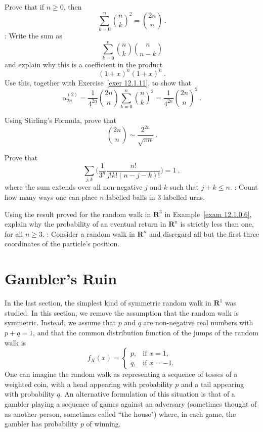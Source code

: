 \begin{LJSItem}
\item\label{exer 12.1.12}
Prove that if $n \ge 0$, then
$$\sum_{k = 0}^n {n \choose k}^2 = {{2n} \choose n}\ .$$
: Write the sum as 
$$\sum_{k = 0}^n {n \choose k}{n \choose {n-k}}$$
and explain why this is a coefficient in the product
$$(1 + x)^n (1 + x)^n\ .$$
Use this, together with Exercise~\ref{exer 12.1.11}, to show that
$$u^{(2)}_{2n} = \frac 1{4^{2n}}{{2n}\choose n}\sum_{k = 0}^n {n \choose k}^2 = 
\frac 1 {4^{2n}} {{2n}\choose n}^2\ .$$

\item\label{exer 12.1.13}
Using Stirling's Formula, prove that
$${{2n}\choose n} \sim \frac {2^{2n}}{\sqrt {\pi n}}\ .$$

\item\label{exer 12.1.14}
Prove that
$$\sum_{j,k} 
\biggl(\frac 1{3^n}\frac{n!}{j!k!(n-j-k)!}\biggr) = 1\ ,$$
where the sum extends over all non-negative $j$ and $k$ such that $j + k \le n$.  : 
Count how many ways one can place $n$ labelled balls in 3 labelled urns.

\item\label{exer 12.1.15}
Using the result proved for the random walk in ${\mathbf R}^3$ in Example~\ref{exam 12.1.0.6}, 
explain why the probability of an eventual return in ${\mathbf R}^n$ is strictly less than one,
for all $n \ge 3$.  : Consider a random walk in ${\mathbf R}^n$ and disregard all but
the first three coordinates of the particle's position.

\end{LJSItem}

\section{Gambler's Ruin\label{sec 12.2}}
\par
In the last section, the simplest kind of symmetric random walk in ${\mathbf R}^1$ was studied. 
In this section, we remove the assumption that the random walk is symmetric.  Instead, we assume
that
$p$ and $q$ are non-negative real numbers with $p+q = 1$, and that the common distribution function
of the jumps of the random walk is
$$f_X(x) = \left \{ \begin{array}{ll}
               p, & \mbox{if $x = 1$},\\ 
               q, & \mbox{if $x = -1$}.
                      \end{array}
             \right.   
$$ 
One can imagine the random walk as representing a sequence of tosses of a weighted coin, with a
head appearing with probability $p$ and a tail appearing with probability $q$.  An alternative
formulation of this situation is that of a gambler playing a sequence of games against an
adversary (sometimes thought of as another person, sometimes called ``the house") where, in
each game, the gambler has probability $p$ of winning.

